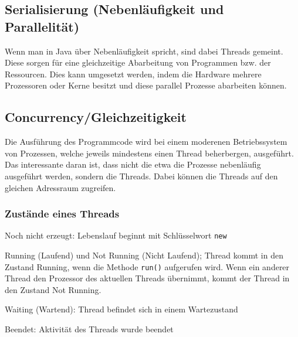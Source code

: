 


\subsection{Serialisierung (Nebenläufigkeit und Parallelität)}
Wenn man in Java über Nebenläufigkeit spricht, sind dabei Threads gemeint. Diese sorgen für eine gleichzeitige Abarbeitung von Programmen bzw. der Ressourcen. Dies kann umgesetzt werden, indem die Hardware mehrere Prozessoren oder Kerne besitzt und diese parallel Prozesse abarbeiten können.



\subsection{Concurrency/Gleichzeitigkeit}
Die Ausführung des Programmcode wird bei einem moderenen Betriebssystem von Prozessen, welche jeweils mindestens einen Thread beherbergen, ausgeführt. Das interessante daran ist, dass nicht die etwa die Prozesse nebenläufig ausgeführt werden, sondern die Threads. Dabei können die Threads auf den gleichen Adressraum zugreifen.

\subsubsection{Zustände eines Threads}
\begin{compactitem}
    \item Noch nicht erzeugt: Lebenslauf beginnt mit Schlüsselwort \texttt{new}
    \item Running (Laufend) und Not Running (Nicht Laufend); Thread kommt in den Zustand Running, wenn die Methode \texttt{run()} aufgerufen wird. Wenn ein anderer Thread den Prozessor des aktuellen Threads übernimmt, kommt der Thread in den Zustand Not Running.     
    \item Waiting (Wartend): Thread befindet sich in einem Wartezustand 
    \item Beendet: Aktivität des Threads wurde beendet
\end{compactitem}

